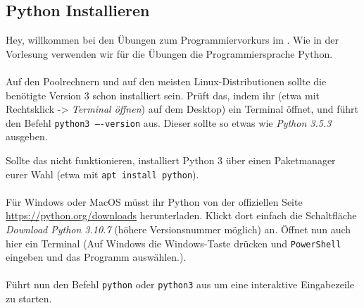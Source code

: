 \subsection{Python Installieren}
Hey, willkommen bei den Übungen zum Programmiervorkurs im \ptitle. Wie in der
Vorlesung verwenden wir für die Übungen die Programmiersprache Python. \\\\
%
Auf den Poolrechnern und auf den meisten Linux-Distributionen sollte die
benötigte Version 3 schon installiert sein. Prüft das, indem ihr (etwa mit
Rechtsklick -> \textit{Terminal öffnen}) auf dem Desktop) ein Terminal öffnet,
und führt den Befehl \texttt{python3 ----version} aus. Dieser sollte so etwas wie
\textit{Python 3.5.3} ausgeben.

Sollte das nicht funktionieren, installiert Python 3 über einen Paketmanager
eurer Wahl (etwa mit \texttt{apt install python}). \\\\
%
Für Windows oder MacOS müsst ihr Python von der offiziellen Seite
\url{https://python.org/downloads} herunterladen. Klickt dort einfach die
Schaltfläche \textit{Download Python 3.10.7} (höhere Versionsnummer möglich) an.
Öffnet nun auch hier ein Terminal (Auf Windows die Windows-Taste drücken und \texttt{PowerShell} eingeben und das Programm auswählen.). \\\\
%
Führt nun den Befehl \texttt{python} oder \texttt{python3} aus um eine
interaktive Eingabezeile zu starten.

